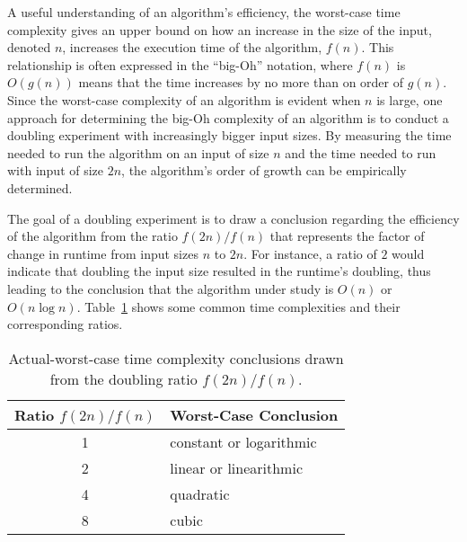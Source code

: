 A useful understanding of an algorithm's efficiency, the worst-case time complexity gives an upper bound on how an
increase in the size of the input, denoted $n$, increases the execution time of the algorithm, $f(n)$.  This
relationship is often expressed in the ``big-Oh'' notation, where $f(n)$ is $O(g(n))$ means that the time increases by
no more than on order of $g(n)$. Since the worst-case complexity of an algorithm is evident when $n$ is large, one
approach for determining the big-Oh complexity of an algorithm is to conduct a doubling experiment with increasingly
bigger input sizes. By measuring the time needed to run the algorithm on an input of size $n$ and the time needed to run
with input of size $2n$, the algorithm's order of growth can be empirically determined.

The goal of a doubling experiment is to draw a conclusion regarding the efficiency of the algorithm from the ratio
$f(2n)/f(n)$ that represents the factor of change in runtime from input sizes $n$ to $2n$. For instance, a ratio of $2$
would indicate that doubling the input size resulted in the runtime's doubling, thus leading to the conclusion that the
algorithm under study is $O(n)$ or $O(n\log n)$.  Table~\ref{table:ratios} shows some common time complexities and their
corresponding ratios.

\begin{table}[t]

  \begin{center}

    \begin{tabular}{c|l}
      Ratio $f(2n)/f(n)$ & Worst-Case Conclusion              \\ \hline
      1                  & constant or logarithmic \\
      2                  & linear or linearithmic  \\
      4                  & quadratic               \\
      8                  & cubic                   \\
    \end{tabular}

  \end{center}
  \vspace*{-.25in}

  \caption{Actual-worst-case time complexity conclusions drawn from the doubling ratio $f(2n)/f(n)$.}\label{table:ratios}

\end{table}

